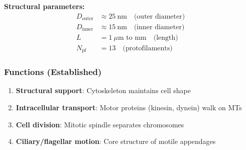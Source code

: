 \begin{center}
\end{center}

\textbf{Structural parameters:}
\begin{equation}
\label{eq:mt-params}
\begin{aligned}
D_{\text{outer}} &\approx 25~\text{nm} \quad \text{(outer diameter)} \\
D_{\text{inner}} &\approx 15~\text{nm} \quad \text{(inner diameter)} \\
L &= 1~\mu\text{m to mm} \quad \text{(length)} \\
N_{\text{pf}} &= 13 \quad \text{(protofilaments)}
\end{aligned}
\end{equation}

\subsubsection{Functions (Established)}\label{functions-established}

\begin{enumerate}
\def\labelenumi{\arabic{enumi}.}
\tightlist
\item
  \textbf{Structural support}: Cytoskeleton maintains cell shape
\item
  \textbf{Intracellular transport}: Motor proteins (kinesin, dynein)
  walk on MTs
\item
  \textbf{Cell division}: Mitotic spindle separates chromosomes
\item
  \textbf{Ciliary/flagellar motion}: Core structure of motile appendages
\end{enumerate}


